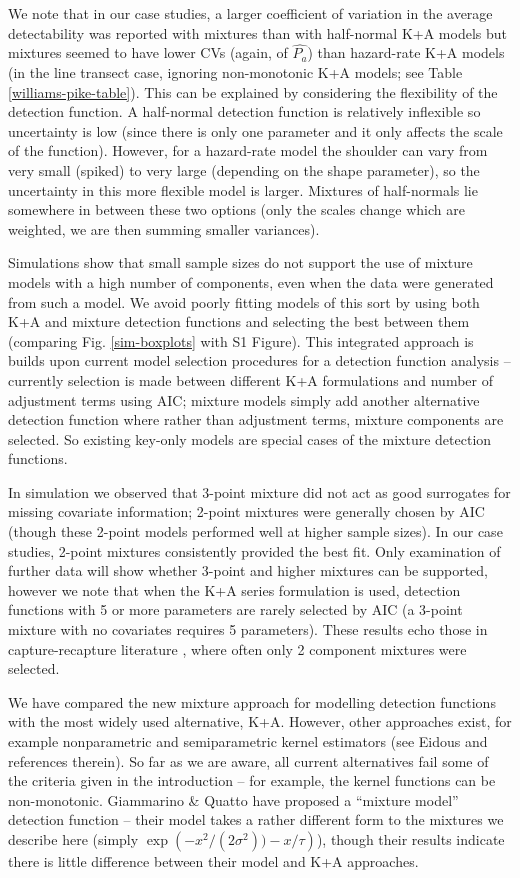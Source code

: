 \documentclass[10pt]{article}
\begin{document}
We note that in our case studies, a larger coefficient of variation in the average detectability was reported with mixtures than with half-normal K+A models but mixtures seemed to have lower CVs (again, of $\hat{P_a}$) than hazard-rate K+A models (in the line transect case, ignoring non-monotonic K+A models; see Table \ref{williams-pike-table}). This can be explained by considering the flexibility of the detection function. A half-normal detection function is relatively inflexible so uncertainty is low (since there is only one parameter and it only affects the scale of the function). However, for a hazard-rate model the shoulder can vary from very small (spiked) to very large (depending on the shape parameter), so the uncertainty in this more flexible model is larger. Mixtures of half-normals lie somewhere in between these two options (only the scales change which are weighted, we are then summing smaller variances). 

Simulations show that small sample sizes do not support the use of mixture models with a high number of components, even when the data were generated from such a model. We avoid poorly fitting models of this sort by using both K+A and mixture detection functions and selecting the best between them (comparing Fig. \ref{sim-boxplots} with S1 Figure). This integrated approach is builds upon current model selection procedures for a detection function analysis -- currently selection is made between different K+A formulations and number of adjustment terms using AIC; mixture models simply add another alternative detection function where rather than adjustment terms, mixture components are selected. So existing key-only models are special cases of the mixture detection functions.

In simulation we observed that 3-point mixture did not act as good surrogates for missing covariate information; 2-point mixtures were generally chosen by AIC (though these 2-point models performed well at higher sample sizes). In our case studies, 2-point mixtures consistently provided the best fit. Only examination of further data will show whether 3-point and higher mixtures can be supported, however we note that when the K+A series formulation is used, detection functions with 5 or more parameters are rarely selected by AIC (a 3-point mixture with no covariates requires 5 parameters). These results echo those in capture-recapture literature \cite{Pledger:2000tc}, where often only 2 component mixtures were selected.

We have compared the new mixture approach for modelling detection functions with the most widely used alternative, K+A. However, other approaches exist, for example nonparametric and semiparametric kernel estimators (see Eidous \cite{Eidous:2011} and references therein). So far as we are aware, all current alternatives fail some of the criteria given in the introduction -- for example, the kernel functions can be non-monotonic. Giammarino \& Quatto \cite{Giammarino:2014eg} have proposed a ``mixture model'' detection function -- their model takes a rather different form to the mixtures we describe here (simply $\exp\left( -x^2/(2\sigma^2)) - x/\tau\right)$), though their results indicate there is little difference between their model and K+A approaches.
\end{document}
